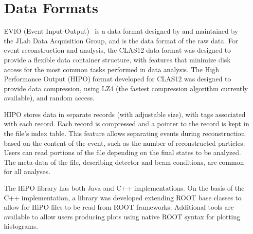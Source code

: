 \section{Data Formats}
\label{sec-formats}

EVIO (Event Input-Output)~\cite{evio} is a data format designed by and maintained by the JLab Data
Acquisition Group, and is the data format of the raw data. For event reconstruction and analysis, the CLAS12
data format was designed to provide a flexible data container structure, with features that minimize disk access
for the most common tasks performed in data analysis. The High Performance Output (HIPO) format developed for
CLAS12 was designed to provide data compression, using LZ4 (the fastest compression algorithm currently available),
and random access.

HIPO stores data in separate records (with adjustable size), with tags associated with each record. Each record
is compressed and a pointer to the record is kept in the file's index table. This feature allows separating events
during reconstruction based on the content of the event, such as the number of reconstructed particles. Users can
read portions of the file depending on the final states to be analyzed.  The meta-data of the file, describing detector
and beam conditions, are common for all analyses.

The HiPO library has both Java and C++ implementations. On the basis of the C++
implementation, a library was developed extending ROOT base classes
to allow for HiPO files to be read from ROOT frameworks. Additional tools
are available to allow users producing plots using native ROOT syntax for plotting histograms.

